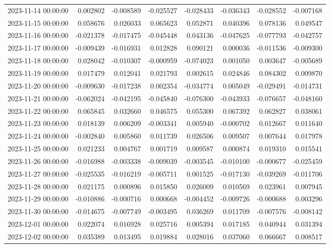 \begin{tabular}{lrrrrrrr}
2023-11-14 00:00:00 & 0.002802 & -0.008589 & -0.025527 & -0.028433 & -0.036343 & -0.028552 & -0.007168 \\
2023-11-15 00:00:00 & 0.058676 & 0.026033 & 0.065623 & 0.052871 & 0.040396 & 0.078136 & 0.049547 \\
2023-11-16 00:00:00 & -0.021378 & -0.017475 & -0.045448 & 0.043136 & -0.047625 & -0.077793 & -0.042757 \\
2023-11-17 00:00:00 & -0.009439 & -0.016931 & 0.012828 & 0.090121 & 0.000036 & -0.011536 & -0.009300 \\
2023-11-18 00:00:00 & 0.028042 & -0.010307 & -0.000959 & -0.074023 & 0.001050 & 0.003647 & -0.005689 \\
2023-11-19 00:00:00 & 0.017479 & 0.012041 & 0.021793 & 0.002615 & 0.024846 & 0.084302 & 0.009870 \\
2023-11-20 00:00:00 & -0.009630 & -0.017238 & 0.002354 & -0.034774 & 0.005049 & -0.029491 & -0.014731 \\
2023-11-21 00:00:00 & -0.062024 & -0.042195 & -0.045840 & -0.076300 & -0.043933 & -0.076657 & -0.048160 \\
2023-11-22 00:00:00 & 0.065845 & 0.032660 & 0.046575 & 0.055300 & 0.067392 & 0.062827 & 0.038061 \\
2023-11-23 00:00:00 & 0.018139 & 0.006209 & -0.003341 & 0.005940 & -0.000702 & 0.012667 & 0.011640 \\
2023-11-24 00:00:00 & -0.002840 & 0.005860 & 0.011739 & 0.026506 & 0.009507 & 0.007644 & 0.017978 \\
2023-11-25 00:00:00 & 0.021233 & 0.004767 & 0.001719 & 0.009587 & 0.000874 & 0.019310 & 0.015541 \\
2023-11-26 00:00:00 & -0.016988 & -0.003338 & -0.009039 & -0.003545 & -0.010100 & -0.000677 & -0.025459 \\
2023-11-27 00:00:00 & -0.025535 & -0.016219 & -0.005711 & 0.001525 & -0.017130 & -0.039269 & -0.011706 \\
2023-11-28 00:00:00 & 0.021175 & 0.000896 & 0.015850 & 0.026009 & 0.010569 & 0.023961 & 0.007945 \\
2023-11-29 00:00:00 & -0.010886 & -0.000716 & 0.000668 & -0.004452 & -0.009726 & -0.000688 & 0.003296 \\
2023-11-30 00:00:00 & -0.014675 & -0.007749 & -0.003495 & 0.036269 & 0.011709 & -0.007576 & -0.008142 \\
2023-12-01 00:00:00 & 0.022074 & 0.016928 & 0.025716 & 0.005394 & 0.017185 & 0.040944 & 0.031394 \\
2023-12-02 00:00:00 & 0.035389 & 0.013495 & 0.019884 & 0.028016 & 0.037060 & 0.066667 & 0.008517 \\

\end{tabular}
